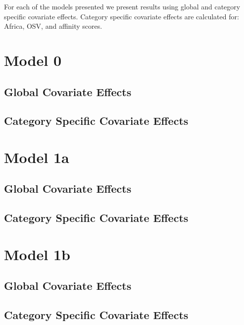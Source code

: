 \documentclass[]{article}
\begin{document}
For each of the models presented we present results using global and category specific covariate effects. Category specific covariate effects are calculated for: Africa, OSV, and affinity scores.

\clearpage
\section{Model 0}
\subsection{Global Covariate Effects}

\clearpage
\subsection{Category Specific Covariate Effects}

\clearpage

\section{Model 1a}
\subsection{Global Covariate Effects}

\clearpage
\subsection{Category Specific Covariate Effects}

\clearpage

\section{Model 1b}
\subsection{Global Covariate Effects}

\clearpage
\subsection{Category Specific Covariate Effects}

\clearpage
\end{document}
